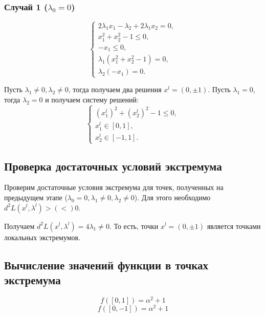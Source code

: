 \documentclass[12pt,a4paper,oneside]{extarticle}
\begin{document}
        \subsubsection{Случай 1 ($\lambda_0 = 0$)}
            \begin{equation*}
                \begin{cases}
                    2\lambda_1x_1 - \lambda_2 + 2\lambda_1x_2 = 0, \\
                    x_1^2+x_2^2 - 1 \le 0, \\
                    -x_1 \le 0, \\
                    \lambda_1(x_1^2+x_2^2 - 1) = 0, \\
                    \lambda_2(-x_1) = 0.
                \end{cases}
            \end{equation*}

            Пусть $\lambda_1 \neq 0, \lambda_2 \neq 0$, тогда получаем два решения $x^l = (0, \pm 1)$. Пусть $\lambda_1 = 0$, тогда $\lambda_2 = 0$ и получаем систему решений:
            \begin{equation*}
                \begin{cases}
                    (x^l_1)^2+(x^l_2)^2 - 1 \le 0, \\
                    x^l_1 \in [0, 1], \\
                    x^l_2 \in [-1,1].
                \end{cases}
            \end{equation*}
    \subsection{Проверка достаточных условий экстремума}
        Проверим достаточные условия экстремума для точек, полученных на предыдущем этапе ($\lambda_0=0, \lambda_1 \neq 0, \lambda_2 \neq 0$). Для этого необходимо $d^2L(x^l, \lambda^l) > (<) 0$.

        Получаем $d^2L(x^l, \lambda^l) = 4\lambda_1 \neq 0$. То есть, точки $x^l = (0, \pm 1)$ является точками локальных экстремумов.

    \subsection{Вычисление значений функции в точках экстремума}
        $$f([0,1]) = \alpha^2 + 1$$
        $$f([0,-1]) = \alpha^2 + 1$$
\end{document}
